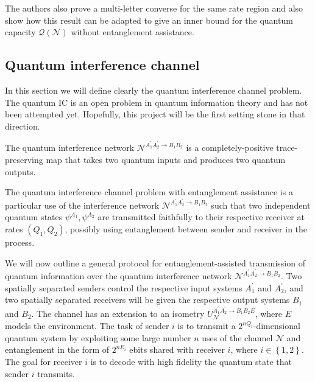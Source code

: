 \documentclass[aps,11pt,twoside,letterpaper]{article}
\begin{document}
		The authors also prove a multi-letter converse for the same rate region
		and also show how this result can be adapted to give an inner bound
		for the quantum capacity $\mathcal{Q}\!\left(\mathcal{N}\right)$ without 
		entanglement assistance.
		

		


	
	\subsection{Quantum interference channel}

		
		In this section we will define clearly the quantum interference channel problem.
		The quantum IC is an open problem in quantum information theory and has
		not been attempted yet. 
		Hopefully, this project will be the first setting stone in that direction.
		
		\begin{definition}
			The quantum interference network $\mathcal{N}^{A_{1}^{\prime}A_{2}^{\prime}\rightarrow B_{1}B_{2}}$
			is a completely-positive trace-preserving map that takes two quantum inputs 
			and produces two quantum outputs.
		\end{definition}
		
		\begin{definition}
			The quantum interference channel problem with entanglement assistance 
			is a particular use of the interference network 
			$\mathcal{N}^{A_{1}^{\prime}A_{2}^{\prime}\rightarrow B_{1}B_{2}}$ such
			that two independent quantum states $\psi^{A_1},\psi^{A_2}$ 
			are transmitted faithfully to their respective receiver at rates $(Q_1,Q_2)$,
			possibly using entanglement between sender and receiver in the process.
		\end{definition}
		
		We will now outline a general protocol for entanglement-assisted
		transmission of quantum information over the quantum interference network
		$\mathcal{N}^{A_{1}^{\prime}A_{2}^{\prime}\rightarrow B_{1}B_{2}}$. 
		Two spatially separated senders control the respective input systems
		$A_{1}^{\prime}$ and $A_{2}^{\prime}$, and two spatially separated receivers
		will be given the respective output systems $B_{1}$ and $B_{2}$. 
		The channel has an	extension to an isometry $U_{\mathcal{N}}^{A_{1}^{\prime}A_{2}^{\prime
		}\rightarrow B_{1}B_{2}E}$, where $E$ models the environment.
		The task of sender $i$ is to transmit a $2^{nQ_{i}}$-dimensional quantum
		system by exploiting some large number $n$ uses of the channel $\mathcal{N}$
		and entanglement in the form of $2^{nE_{i}}$ ebits shared with receiver $i$,
		where $i\in\left\{  1,2\right\}  $. The goal for receiver $i$ is to decode
		with high fidelity the quantum state that sender $i$ transmits.
\end{document}
